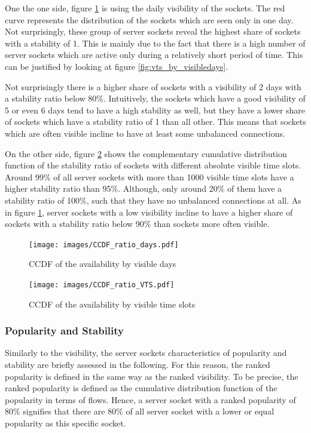 One the one side, figure \ref{fig:ccdf_ratio_days} is using the daily visibility of the sockets.
The red curve represents the distribution of the sockets which are seen only in one day.
Not surprisingly, these group of \glspl{server socket} reveal the highest share of sockets with a stability of 1. 
This is mainly due to the fact that there is a high number of \glspl{server socket} which are active only during a relatively short period of time. This can be justified by looking at figure \ref{fig:vts_by_visibledays}.

Not surprisingly there is a higher share of sockets with a visibility of 2 days
with a stability ratio below 80\%.
Intuitively, the sockets which have a good visibility of 5 or even 6 days tend to have a high stability as well, but they have a lower share of sockets which have a stability ratio of 1 than all other.
This means that sockets which are often visible incline to have at least some unbalanced connections.

On the other side, figure \ref{fig:ccdf_ratio_vts} shows the complementary cumulative distribution function of the stability ratio of sockets with different absolute visible time slots. 
Around 99\% of all \glspl{server socket} with more than 1000 visible time slots have a higher stability ratio than 95\%.
Although, only around 20\% of them have a stability ratio of 100\%, such that they have no unbalanced connections at all.
As in figure \ref{fig:ccdf_ratio_days}, \glspl{server socket} with a low visibility incline to have a higher share of sockets with a stability ratio below 90\% than sockets more often visible. 

\begin{landscape}
\begin{figure}
	[p] \centering
	\texttt{[image: images/CCDF\_ratio\_days.pdf]}
	\caption{CCDF of the availability by visible days}
	\label{fig:ccdf_ratio_days}
\end{figure}
\end{landscape}

\begin{landscape}
\begin{figure}
	[p] \centering
	\texttt{[image: images/CCDF\_ratio\_VTS.pdf]}
	\caption{CCDF of the availability by visible time slots}
	\label{fig:ccdf_ratio_vts}
\end{figure}
\end{landscape}

\subsubsection{Popularity and Stability}
Similarly to the visibility, the \glspl{server socket} characteristics of popularity and stability are briefly assessed in the following. 
For this reason, the ranked popularity is defined in the same way as the ranked visibility.
To be precise, the ranked popularity is defined as the cumulative distribution function of the popularity in terms of flows. 
Hence, a \gls{server socket} with a ranked popularity of 80\% signifies that there are 80\% of all \gls{server socket} with a lower or equal popularity as this specific socket.


